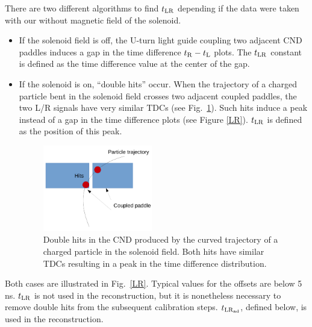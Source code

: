 There are two different algorithms to find $t_{\rm{LR}}$ depending if the data were taken with our without magnetic field of the solenoid. 
\begin{itemize}
\item If the solenoid field is off, the U-turn light guide coupling two adjacent CND paddles induces a gap in the time difference $t_{\rm{R}}-t_{\rm{L}}$ plots. The $t_{\rm{LR}}$ constant is defined as the time difference value at the center of the gap.
\item If the solenoid is on, ``double hits'' occur. When the trajectory of a charged particle bent in the solenoid field crosses two adjacent coupled paddles, the two L/R signals have very similar TDCs (see Fig.~\ref{doublehit}). Such hits induce a peak instead of a gap in the time difference plots (see Figure \ref{LR}). $t_{\rm{LR}}$ is defined as the position of this peak.

\begin{figure}[htb]
\begin{center}
\includegraphics[width=0.45\textwidth]{Figure/doublehit.png} 
\end{center}
\caption{Double hits in the CND produced by the curved trajectory of a charged particle in the solenoid field. Both hits have similar TDCs resulting in a peak in the time difference distribution.}
\label{doublehit}
\end{figure}

\end{itemize}
Both cases are illustrated in Fig.~\ref{LR}. Typical values for the offsets are below 5 ns. $t_{\rm{LR}}$ is not used in the reconstruction, but it is nonetheless necessary to remove double hits from the subsequent calibration steps. $t_{\rm{LR}_{\rm{ad}}}$, defined below, is used in the reconstruction.
%
